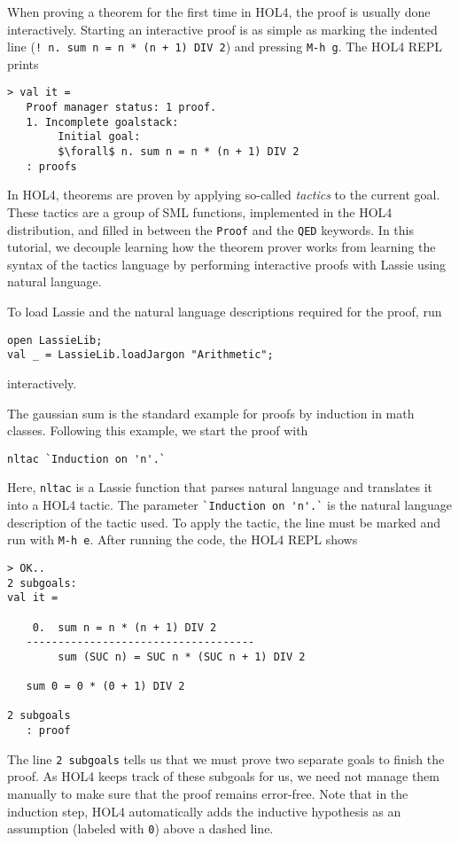 \documentclass[10pt]{scrartcl}
\newcommand{\ekey}[1]{\texttt{#1}}
\begin{document}
When proving a theorem for the first time in HOL4, the proof is usually done
interactively.
Starting an interactive proof is as simple as marking the indented line
(\lstinline{! n. sum n = n * (n + 1) DIV 2}) and pressing \ekey{M-h g}.
The HOL4 REPL prints

\begin{lstlisting}[mathescape=true, frame=single]
> val it =
   Proof manager status: 1 proof.
   1. Incomplete goalstack:
        Initial goal:
        $\forall$ n. sum n = n * (n + 1) DIV 2
   : proofs
\end{lstlisting}

In HOL4, theorems are proven by applying so-called \emph{tactics} to the current
goal.
These tactics are a group of SML functions, implemented in the HOL4
distribution, and filled in between the \lstinline{Proof} and the \lstinline{QED}
keywords.
In this tutorial, we decouple learning how the theorem prover works from
learning the syntax of the tactics language by performing interactive proofs
with Lassie using natural language.

To load Lassie and the natural language descriptions required for the proof,
run
\begin{lstlisting}
open LassieLib;
val _ = LassieLib.loadJargon "Arithmetic";
\end{lstlisting}
interactively.

The gaussian sum is the standard example for proofs by induction in math classes.
Following this example, we start the proof with
\begin{lstlisting}
nltac `Induction on 'n'.`
\end{lstlisting}

Here, \lstinline{nltac} is a Lassie function that parses natural language and
translates it into a HOL4 tactic.
The parameter \lstinline{`Induction on 'n'.`} is the natural language
description of the tactic used.
To apply the tactic, the line must be marked and run with \ekey{M-h e}.
After running the code, the HOL4 REPL shows
\begin{lstlisting}
> OK..
2 subgoals:
val it =

    0.  sum n = n * (n + 1) DIV 2
   ------------------------------------
        sum (SUC n) = SUC n * (SUC n + 1) DIV 2

   sum 0 = 0 * (0 + 1) DIV 2

2 subgoals
   : proof
\end{lstlisting}

The line \lstinline{2 subgoals} tells us that we must prove two separate goals
to finish the proof.
As HOL4 keeps track of these subgoals for us, we need not manage them manually
to make sure that the proof remains error-free.
Note that in the induction step, HOL4 automatically adds the inductive
hypothesis as an assumption (labeled with \lstinline{0}) above a dashed line.
\end{document}

